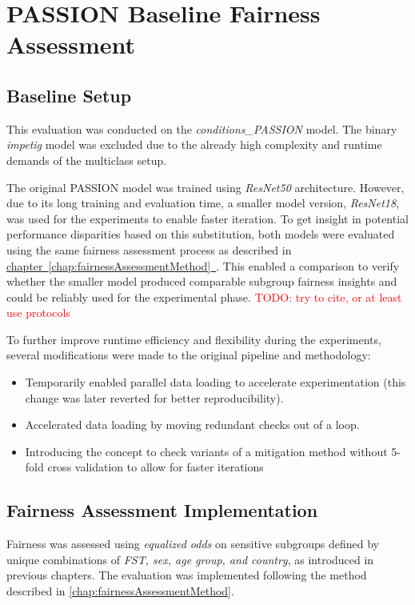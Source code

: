 \documentclass[12pt, a4paper, oneside]{book}   	%
\renewcommand{\todo}[1]{\textcolor{red}{TODO: #1}}
\newcommand{\linkchap}[1]{\hyperref[#1]{chapter~\ref{#1}~\nameref{#1}}}
\begin{document}
		
		\section{PASSION Baseline Fairness Assessment} \label{chap:PASSIONFairnessAssessmentBaselineExecution}
		
		\subsection{Baseline Setup}
		This evaluation was conducted on the \textit{conditions\_PASSION} model. The binary \textit{impetig} model was excluded due to the already high complexity and runtime demands of the multiclass setup.
		
		The original PASSION model was trained using \textit{ResNet50} architecture. However, due to its long training and evaluation time, a smaller model version, \textit{ResNet18}, was used for the experiments to enable faster iteration. To get insight in potential performance disparities based on this substitution, both models were evaluated using the same fairness assessment process as described in \linkchap{chap:fairnessAssessmentMethod}. This enabled a comparison to verify whether the smaller model produced comparable subgroup fairness insights and could be reliably used for the experimental phase.
		\todo{try to cite, or at least use protocols}
		
		To further improve runtime efficiency and flexibility during the experiments, several modifications were made to the original pipeline and methodology:
		
		\begin{itemize}
			\item Temporarily enabled parallel data loading to accelerate experimentation (this change was later reverted for better reproducibility).
			\item Accelerated data loading by moving redundant checks out of a loop.
			\item Introducing the concept to check variants of a mitigation method without 5-fold cross validation to allow for faster iterations
		\end{itemize}
		
		
		\subsection{Fairness Assessment Implementation} \label{chap:fairnessAssessmentImpementation}
		Fairness was assessed using \textit{equalized odds} on sensitive subgroups defined by unique combinations of \textit{\gls{FST}, sex, age group, and country}, as introduced in previous chapters. The evaluation was implemented following the method described in \autoref{chap:fairnessAssessmentMethod}.
		
\end{document}
